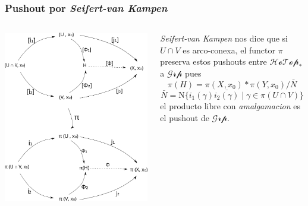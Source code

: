 \documentclass[xetex,mathserif,serif]{beamer}
\newcommand{\vank}{\emph{Seifert-van Kampen} }
\begin{document}
  \begin{frame}
    \frametitle{Pushout por \vank}
    \begin{columns}
      \begin{column}{0.55\textwidth}
        \begin{flushleft}
          \includegraphics[scale=0.32]{../tesis/imagenes/pushoutHotop.png}
        \end{flushleft}
      \end{column}
      \begin{column}{0.45\textwidth}
        \begin{block}{}
          \vank nos dice que si \(U \cap V\) es arco-conexa, el functor
          \(\pi\) preserva estos pushouts entre \(\mathscr{HoTop}_*\) a
          \(\mathscr{Grp}\) pues
          \[ \pi (H) = \pi (X,x_0) * \pi(Y,x_0) / \bar N \]
          \[ \bar N = \text{N}\{i_{1}(\gamma) \overline{i_2(\gamma)} \mid
            \gamma \in \pi (U \cap V)\}\] el producto
          libre con \emph{amalgamacion} es el pushout de
          \(\mathscr{Grp}\).
        \end{block}
      \end{column}
    \end{columns}
  \end{frame}
\end{document}
